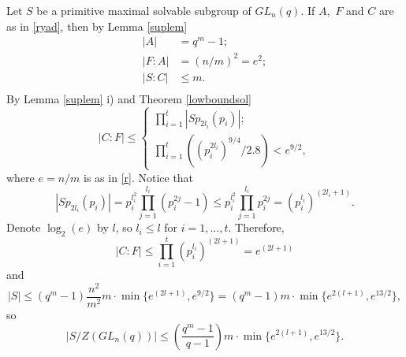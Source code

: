Let $S$ be a primitive maximal solvable  subgroup of $GL_n(q)$. If $A,$ $F$ and $C$ are as in  \eqref{ryad}, then by Lemma \ref{suplem}
\begin{equation*}
\begin{split}
|A|&=q^m-1;\\
|F:A|&=(n/m)^2=e^2;\\
|S:C|&\le m.\\
\end{split}
\end{equation*}
By  Lemma \ref{suplem} i) and Theorem \ref{lowboundsol}
\begin{equation}
\label{CFbound}
|C:F| \le 
\begin{cases}
\prod_{i=1}^t |Sp_{2l_i}(p_i)|;\\
\prod_{i=1}^t ((p_i^{2l_i})^{9/4}/2.8)<e^{9/2},
\end{cases}
\end{equation}
where $e=n/m$ is as in \eqref{r}. Notice that 
$$|Sp_{2l_i}(p_i)|=p_i^{l_i^2} \prod_{j=1}^{l_i}(p_i^{2j}-1)\le p_i^{l_i^2} \prod_{j=1}^{l_i}p_i^{2j}=(p_i^{l_i})^{(2l_i+1)}. $$
Denote $\log_2(e)$ by $l$, so $l_i \le l$ for $i=1, \ldots, t.$ Therefore,
$$|C:F| \le \prod_{i=1}^t (p_i^{l_i})^{(2l+1)}=e^{(2l+1)} $$ 
and
\begin{equation*}
|S|\le (q^m-1)\frac{n^2}{m^2}m \cdot \min \{ e^{(2l+1)}, e^{9/2}\}=(q^m-1)m \cdot \min \{e^{2(l+1)}, e^{13/2}\},
\end{equation*}
so
\begin{equation}\label{H}
|S/Z(GL_n(q))|\le \left( \frac{q^m-1}{q-1} \right) m\cdot \min \{e^{2(l+1)}, e^{13/2}\}.
\end{equation}





